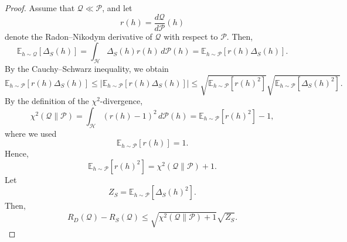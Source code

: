 \documentclass{article}
\theoremstyle{plain}
\theoremstyle{definition}
\theoremstyle{remark}
\begin{document}
\begin{proof}
Assume that $\mathcal Q\ll \mathcal P$, and let
\begin{equation}
r(h)=\frac{d\mathcal Q}{d\mathcal P}(h)
\end{equation}
denote the Radon--Nikodym derivative of $\mathcal Q$ with respect to $\mathcal P$. Then,
\begin{equation}
\mathbb E_{h\sim\mathcal Q}[\Delta_S(h)]
=
\int_{\mathcal H}\Delta_S(h)r(h)\,d\mathcal P(h)
=
\mathbb E_{h\sim\mathcal P}[r(h)\Delta_S(h)].
\end{equation}
By the Cauchy--Schwarz inequality, we obtain
\begin{equation}
\mathbb E_{h\sim\mathcal P}[r(h)\Delta_S(h)]
\le
\left|
\mathbb E_{h\sim\mathcal P}[r(h)\Delta_S(h)]
\right|
\le
\sqrt{\mathbb E_{h\sim\mathcal P}[r(h)^2]}
\sqrt{\mathbb E_{h\sim\mathcal P}[\Delta_S(h)^2]}.
\end{equation}
By the definition of the $\chi^2$-divergence,
\begin{equation}
\chi^2(\mathcal Q\|\mathcal P)
=
\int_{\mathcal H}(r(h)-1)^2\,d\mathcal P(h)
=
\mathbb E_{h\sim\mathcal P}[r(h)^2]-1,
\end{equation}
where we used
\begin{equation}
\mathbb E_{h\sim\mathcal P}[r(h)]=1.
\end{equation}
Hence,
\begin{equation}
\mathbb E_{h\sim\mathcal P}[r(h)^2]
=
\chi^2(\mathcal Q\|\mathcal P)+1.
\end{equation}
Let
\begin{equation}
Z_S
=
\mathbb E_{h\sim\mathcal P}[\Delta_S(h)^2].
\end{equation}
Then,
\begin{equation}
R_D(\mathcal Q)-R_S(\mathcal Q)
\le
\sqrt{\chi^2(\mathcal Q\|\mathcal P)+1}
\sqrt{Z_S}.
\end{equation}


\end{proof}
\end{document}
